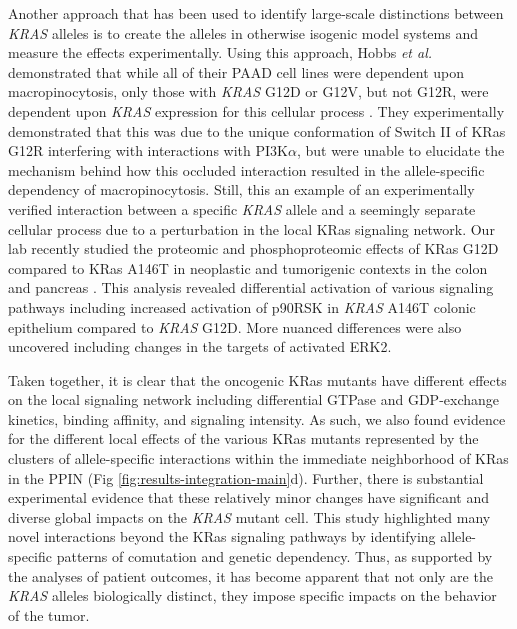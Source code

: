 \documentclass[english, 10pt, letterpaper]{article}
\newcommand{\KRAS}{\emph{KRAS}}
\newcommand{\kras}{KRas}
\begin{document}
Another approach that has been used to identify large-scale distinctions between \KRAS{} alleles is to create the alleles in otherwise isogenic model systems and measure the effects experimentally.
Using this approach, Hobbs \emph{et al.} demonstrated that while all of their PAAD cell lines were dependent upon macropinocytosis, only those with \KRAS{} G12D or G12V, but not G12R, were dependent upon \KRAS{} expression for this cellular process \cite{Hobbs2019AtypicalCancer.}.
They experimentally demonstrated that this was due to the unique conformation of Switch II of \kras{} G12R interfering with interactions with PI3K$\alpha$, but were unable to elucidate the mechanism behind how this occluded interaction resulted in the allele-specific dependency of macropinocytosis.
Still, this an example of an experimentally verified interaction between a specific \KRAS{} allele and a seemingly separate cellular process due to a perturbation in the local \kras{} signaling network.
Our lab recently studied the proteomic and phosphoproteomic effects of \kras{} G12D compared to \kras{} A146T in neoplastic and tumorigenic contexts in the colon and pancreas \cite{Poulin2019}.
This analysis revealed differential activation of various signaling pathways including increased activation of p90RSK in \KRAS{} A146T colonic epithelium compared to \KRAS{} G12D.
More nuanced differences were also uncovered including changes in the targets of activated ERK2.

Taken together, it is clear that the oncogenic \kras{} mutants have different effects on the local signaling network including differential GTPase and GDP-exchange kinetics, binding affinity, and signaling intensity.
As such, we also found evidence for the different local effects of the various \kras{} mutants represented by the clusters of allele-specific interactions within the immediate neighborhood of \kras{} in the PPIN (Fig \ref{fig:results-integration-main}d).
Further, there is substantial experimental evidence that these relatively minor changes have significant and diverse global impacts on the \KRAS{} mutant cell.
This study highlighted many novel interactions beyond the \kras{} signaling pathways by identifying allele-specific patterns of comutation and genetic dependency.
Thus, as supported by the analyses of patient outcomes, it has become apparent that not only are the \KRAS{} alleles biologically distinct, they impose specific impacts on the behavior of the tumor.

\end{document}

